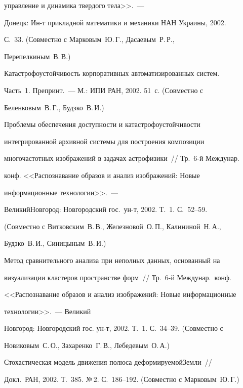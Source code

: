 управление и динамика твердого тела>>.~---


Донецк: Ин-т прикладной математики и механики НАН Украины, 2002.


С.~33. (Совместно с Марковым~Ю.\,Г., Дасаевым~Р.\,Р.,


Перепелкиным~В.\,В.)





 Катастрофоустойчивость корпоративных автоматизированных систем.


Часть~1. Препринт.~--- М.: ИПИ РАН, 2002. 51~с. (Совместно с


Беленковым~В.\,Г., Будзко~В.\,И.)





 Проблемы обеспечения доступности и катастрофоустой\-чи\-вости


интегрированной архивной системы для построения композиции


многочастотных изоб\-ра\-же\-ний в задачах астрофизики~// Тр.\ 6-й Междунар.\


конф. <<Распознавание образов и анализ изображений: Новые


информационные технологии>>.~---


Великий\linebreak Новгород: Новгородский гос.\ ун-т, 2002. Т.~1. С.~52--59.


(Совместно с Витковским~В.\,В., Железновой~О.\,П., Калининой~Н.\,А.,


Будзко~В.\,И., Синицыным~В.\,И.)





 Метод сравнительного анализа при неполных данных, основанный на


визуализации кластеров пространстве форм~// Тр.\ 6-й Междунар.\ конф.\


<<Распознавание образов и анализ изоб\-ра\-же\-ний: Новые информационные


технологии>>.~--- Великий


Новгород: Новгородский гос. ун-т, 2002. Т.~1. С.~34--39. (Совместно с


Новиковым~С.\,О., Захаренко~Г.\,В., Лебедевым~О.\,А.)





 Стохастическая модель движения полюса деформируемой\linebreak Зем\-ли~//


Докл.\ РАН, 2002. Т.~385. №\,2. С.~186--192. (Совместно с Марковым~Ю.\,Г.)





